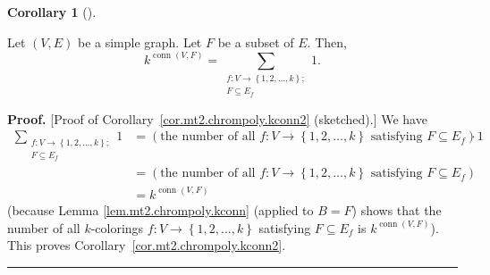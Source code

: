 \documentclass[numbers=enddot,12pt,final,onecolumn,notitlepage]{scrartcl}%
\theoremstyle{definition}
\newtheorem{coro}[theo]{Corollary}
\newenvironment{corollary}[1][]
{\begin{coro}[#1]\begin{leftbar}}
{\end{leftbar}\end{coro}}
\newenvironment{proof}[1][Proof]{\noindent\textbf{#1.} }{\ \rule{0.5em}{0.5em}}
\let\sumnonlimits\sum
\renewcommand{\sum}{\sumnonlimits\limits}
\newcommand{\conn}{\operatorname{conn}}
\newcommand{\set}[1]{\left\{ #1 \right\}}
\newcommand{\tup}[1]{\left( #1 \right)}
\begin{document}
\begin{corollary} \label{cor.mt2.chrompoly.kconn2}
Let $\tup{V, E}$ be a simple graph.
Let $F$ be a subset of $E$. Then,
\[
k^{ \conn \tup{V, F} }
= \sum_{\substack{f : V \to
   \set{1, 2, \ldots, k} ; \\ F\subseteq E_f }} 1.
\]
\end{corollary}

\begin{proof}
[Proof of Corollary~\ref{cor.mt2.chrompoly.kconn2} (sketched).]
We have
\begin{align*}
\sum_{\substack{f:V \to \set{1, 2, \ldots, k} ;\\F\subseteq
E_f }}1 &  =\left(  \text{the number of all }
f : V \to \set{1, 2, \ldots, k}  \text{ satisfying }
F\subseteq E_f \right)  \cdot 1\\
&  =\left(  \text{the number of all }f : V \to \set{1, 2, \ldots, k}
\text{ satisfying } F\subseteq E_f \right)  \\
&  =k^{ \conn \left(  V,F\right)  }
\end{align*}
(because Lemma \ref{lem.mt2.chrompoly.kconn} (applied to $B=F$) shows
that the number of all $k$-colorings $f : V \to \set{1, 2, \ldots, k}$
satisfying $F \subseteq E_f$ is $k^{ \conn \left(  V,F\right)
}$).
This proves Corollary~\ref{cor.mt2.chrompoly.kconn2}.
\end{proof}
\end{document}
